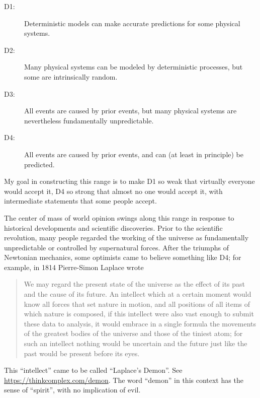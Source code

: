 \documentclass[12pt]{book}
\theoremstyle{exercise}
\begin{document}

\begin{description}

\item[D1:] Deterministic models can make accurate predictions
for some physical systems.

\item[D2:] Many physical systems can be modeled by deterministic
processes, but some are intrinsically random.

\item[D3:] All events are caused by prior events, but many
physical systems are nevertheless fundamentally unpredictable.

\item[D4:] All events are caused by prior events, and can (at
least in principle) be predicted.


\end{description}

My goal in constructing this range is to make D1 so weak that
virtually everyone would accept it, D4 so strong that almost no one
would accept it, with intermediate statements that some people accept.

The center of mass of world opinion swings along this range in
response to historical developments and scientific discoveries.  Prior
to the scientific revolution, many people regarded the working of the
universe as fundamentally unpredictable or controlled by supernatural
forces.  After the triumphs of Newtonian mechanics, some optimists
came to believe something like D4; for example, in 1814 Pierre-Simon
Laplace wrote


\begin{quote}
We may regard the present state of the universe as the effect of its
past and the cause of its future. An intellect which at a certain
moment would know all forces that set nature in motion, and all
positions of all items of which nature is composed, if this intellect
were also vast enough to submit these data to analysis, it would
embrace in a single formula the movements of the greatest bodies of
the universe and those of the tiniest atom; for such an intellect
nothing would be uncertain and the future just like the past would be
present before its eyes.
\end{quote}

This ``intellect'' came to be called ``Laplace's Demon''.
See \url{https://thinkcomplex.com/demon}.  The word
``demon'' in this context has the sense of ``spirit'', with no
implication of evil.
\end{document}
